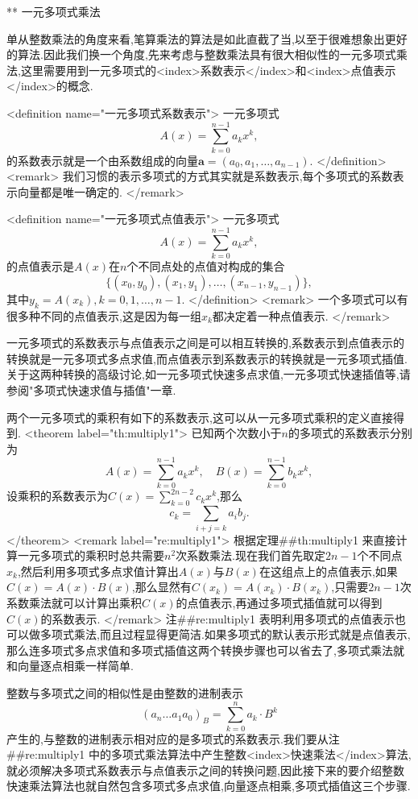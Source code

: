 ** 一元多项式乘法

单从整数乘法的角度来看,笔算乘法的算法是如此直截了当,以至于很难想象出更好的算法.因此我们换一个角度,先来考虑与整数乘法具有很大相似性的一元多项式乘法,这里需要用到一元多项式的<index>系数表示</index>和<index>点值表示</index>的概念.

<definition  name="一元多项式系数表示">
一元多项式$$A(x)=\sum_{k=0}^{n-1}a_kx^k,$$的系数表示就是一个由系数组成的向量$\mathbf{a}=(a_0,a_1,\ldots,a_{n-1})$.
</definition>
<remark>
我们习惯的表示多项式的方式其实就是系数表示,每个多项式的系数表示向量都是唯一确定的.
</remark>

<definition  name="一元多项式点值表示">
一元多项式$$A(x)=\sum_{k=0}^{n-1}a_kx^k,$$的点值表示是$A(x)$在$n$个不同点处的点值对构成的集合$$\{(x_0,y_0),(x_1,y_1),\ldots,(x_{n-1},y_{n-1})\},$$其中$y_k=A(x_k),k=0,1,\ldots,n-1$.
</definition>
<remark>
一个多项式可以有很多种不同的点值表示,这是因为每一组$x_k$都决定着一种点值表示.
</remark>

一元多项式的系数表示与点值表示之间是可以相互转换的,系数表示到点值表示的转换就是一元多项式多点求值,而点值表示到系数表示的转换就是一元多项式插值.关于这两种转换的高级讨论,如一元多项式快速多点求值,一元多项式快速插值等,请参阅"多项式快速求值与插值"一章.

两个一元多项式的乘积有如下的系数表示,这可以从一元多项式乘积的定义直接得到.
<theorem label="th:multiply1">
已知两个次数小于$n$的多项式的系数表示分别为$$A(x)=\sum_{k=0}^{n-1}a_kx^k,\quad B(x)=\sum_{k=0}^{n-1}b_kx^k,$$设乘积的系数表示为$C(x)=\sum\limits_{k=0}^{2n-2}c_kx^k$,那么$$c_k=\sum_{i+j=k}a_ib_j.$$
</theorem>
<remark label="re:multiply1">
根据定理##th:multiply1
来直接计算一元多项式的乘积时总共需要$n^2$次系数乘法.现在我们首先取定$2n-1$个不同点$x_k$,然后利用多项式多点求值计算出$A(x)$与$B(x)$在这组点上的点值表示,如果$C(x)=A(x)\cdot B(x)$,那么显然有$C(x_k)=A(x_k)\cdot B(x_k)$,只需要$2n-1$次系数乘法就可以计算出乘积$C(x)$的点值表示,再通过多项式插值就可以得到$C(x)$的系数表示.
</remark>
注##re:multiply1
表明利用多项式的点值表示也可以做多项式乘法,而且过程显得更简洁.如果多项式的默认表示形式就是点值表示,那么连多项式多点求值和多项式插值这两个转换步骤也可以省去了,多项式乘法就和向量逐点相乘一样简单.

整数与多项式之间的相似性是由整数的进制表示$$(a_n\ldots a_1a_0)_B=\sum_{k=0}^na_k\cdot B^k$$产生的,与整数的进制表示相对应的是多项式的系数表示.我们要从注##re:multiply1
中的多项式乘法算法中产生整数<index>快速乘法</index>算法,就必须解决多项式系数表示与点值表示之间的转换问题,因此接下来的要介绍整数快速乘法算法也就自然包含多项式多点求值,向量逐点相乘,多项式插值这三个步骤.

